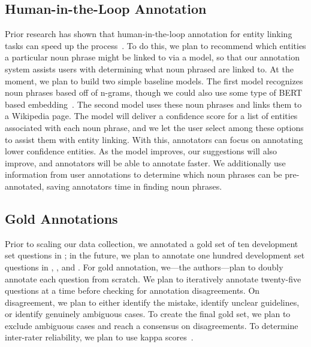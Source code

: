 \subsection{Human-in-the-Loop Annotation}
\label{sec:active} 
Prior research has shown that human-in-the-loop annotation for entity linking tasks can speed up the process~\cite{klie2020hero}. 
To do this, we plan to recommend which entities a particular noun phrase might be linked to via a model, so that  our annotation system assists users with determining what noun phrased are linked to. 
At the moment, we plan to build two simple baseline models. 
The first model recognizes noun phrases based off of n-grams, though we could also use some type of BERT based embedding~\cite{devlin2018bert}. 
The second model uses these noun phrases and links them to a Wikipedia page. 
The model will deliver a confidence score for a list of entities associated with each noun phrase, and we let the user select among these options to assist them with entity linking. 
With this, annotators can focus on annotating lower confidence entities. 
As the model improves, our suggestions will also improve, and annotators will be able to annotate faster. 
We additionally use information from user annotations to determine which noun phrases can be pre-annotated, saving annotators time in finding noun phrases.


\subsection{Gold Annotations}
\label{sec:gold}
Prior to scaling our data collection, we annotated a gold set of ten development set questions in \qb{}; in the future, we plan to annotate one hundred development set questions in \qb{}, \triviaqa{}, and \searchqa{}.
For gold annotation, we---the authors---plan to doubly annotate each question from scratch. 
We plan to iteratively annotate twenty-five questions at a time before checking for annotation disagreements.
On disagreement, we plan to either identify the mistake, identify unclear guidelines, or identify genuinely ambiguous cases.
To create the final gold set, we plan to exclude ambiguous cases and reach a consensus on disagreements.
To determine inter-rater reliability, we plan to use kappa scores~\cite{mchugh2012interrater}.  


